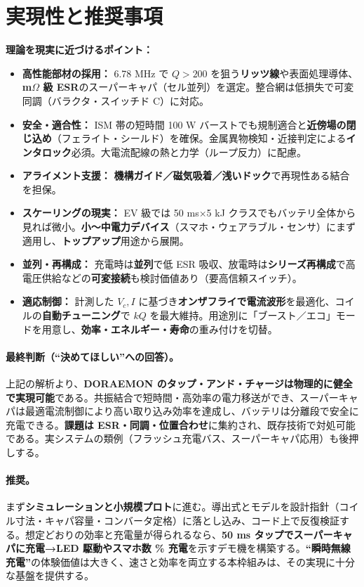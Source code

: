 \documentclass[11pt]{ctexart}
\begin{document}
\section{実現性と推奨事項}
\textbf{理論を現実に近づけるポイント：}
\begin{itemize}
  \item \textbf{高性能部材の採用：} 6.78 MHz で $Q>200$ を狙う\textbf{リッツ線}や表面処理導体、\textbf{m$\Omega$ 級 ESR}のスーパーキャパ（セル並列）を選定。整合網は低損失で可変同調（バラクタ・スイッチド C）に対応。
  \item \textbf{安全・適合性：} ISM 帯の短時間 100 W バーストでも規制適合と\textbf{近傍場の閉じ込め}（フェライト・シールド）を確保。金属異物検知・近接判定による\textbf{インタロック}必須。大電流配線の熱と力学（ループ反力）に配慮。
  \item \textbf{アライメント支援：} \textbf{機構ガイド／磁気吸着／浅いドック}で再現性ある結合を担保。
  \item \textbf{スケーリングの現実：} EV 級では 50 ms$\times$5 kJ クラスでもバッテリ全体から見れば微小。\textbf{小〜中電力デバイス}（スマホ・ウェアラブル・センサ）にまず適用し、\textbf{トップアップ}用途から展開。
  \item \textbf{並列・再構成：} 充電時は\textbf{並列}で低 ESR 吸収、放電時は\textbf{シリーズ再構成}で高電圧供給などの\textbf{可変接続}も検討価値あり（要高信頼スイッチ）。
  \item \textbf{適応制御：} 計測した $V_c,I$ に基づき\textbf{オンザフライで電流波形}を最適化、コイルの\textbf{自動チューニング}で $kQ$ を最大維持。用途別に「ブースト／エコ」モードを用意し、\textbf{効率・エネルギー・寿命}の重み付けを切替。
\end{itemize}

\paragraph{最終判断（“決めてほしい”への回答）。} 上記の解析より、\textbf{DORAEMON のタップ・アンド・チャージは物理的に健全で実現可能}である。共振結合で短時間・高効率の電力移送ができ、スーパーキャパは最適電流制御により高い取り込み効率を達成し、バッテリは分離段で安全に充電できる。\textbf{課題は ESR・同調・位置合わせ}に集約され、既存技術で対処可能である。実システムの類例（フラッシュ充電バス、スーパーキャパ応用）も後押しする。

\paragraph{推奨。} まず\textbf{シミュレーションと小規模プロト}に進む。導出式とモデルを設計指針（コイル寸法・キャパ容量・コンバータ定格）に落とし込み、コード上で反復検証する。想定どおりの効率と充電量が得られるなら、\textbf{50 ms タップでスーパーキャパに充電→LED 駆動やスマホ数 \% 充電}を示すデモ機を構築する。\textbf{“瞬時無線充電”}の体験価値は大きく、速さと効率を両立する本枠組みは、その実現に十分な基盤を提供する。
\end{document}
